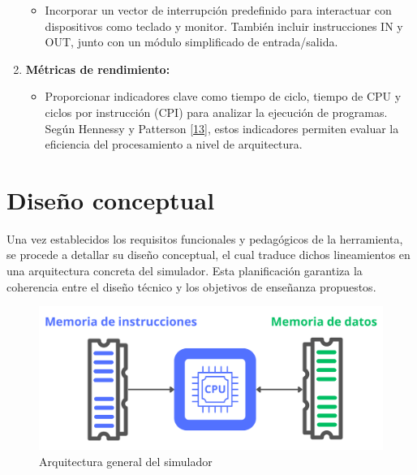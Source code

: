 \documentclass[12pt,oneside]{templates/unerthesis}
\providecommand{\tightlist}{%
  \setlength{\itemsep}{0pt}\setlength{\parskip}{0pt}}
\begin{document}
\begin{enumerate}
  \begin{itemize}
  \tightlist
  \item
    Incorporar un vector de interrupción predefinido para interactuar con dispositivos como teclado y monitor. También incluir instrucciones IN y OUT, junto con un módulo simplificado de entrada/salida.
  \end{itemize}
\item
  \textbf{Métricas de rendimiento:}

  \begin{itemize}
  \tightlist
  \item
    Proporcionar indicadores clave como tiempo de ciclo, tiempo de CPU y ciclos por instrucción (CPI) para analizar la ejecución de programas. Según Hennessy y Patterson \protect\hyperlink{ref-hennessy2017computer}{{[}13{]}}, estos indicadores permiten evaluar la eficiencia del procesamiento a nivel de arquitectura.
  \end{itemize}
\end{enumerate}

\hypertarget{diseuxf1o-conceptual}{%
\section{Diseño conceptual}\label{diseuxf1o-conceptual}}

Una vez establecidos los requisitos funcionales y pedagógicos de la herramienta, se procede a detallar su diseño conceptual, el cual traduce dichos lineamientos en una arquitectura concreta del simulador. Esta planificación garantiza la coherencia entre el diseño técnico y los objetivos de enseñanza propuestos.

\begin{figure}

{\centering \includegraphics[width=0.85\linewidth]{images/harvard} 

}

\caption{Arquitectura general del simulador}\label{fig:vonsim8}
\end{figure}
\end{document}

